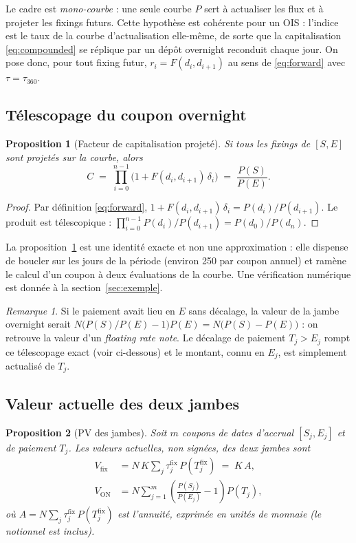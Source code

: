 \documentclass[11pt,a4paper]{article}
\newcommand{\DF}[1]{P(#1)}
\theoremstyle{plain}
\newtheorem{proposition}{Proposition}
\theoremstyle{definition}
\theoremstyle{remark}
\newtheorem*{remarque}{Remarque}
\begin{document}
Le cadre est \emph{mono-courbe} : une seule courbe $P$ sert à actualiser les flux et à projeter les
fixings futurs. Cette hypothèse est cohérente pour un OIS : l'indice est le taux de la courbe
d'actualisation elle-même, de sorte que la capitalisation \eqref{eq:compounded} se réplique par un
dépôt overnight reconduit chaque jour. On pose donc, pour tout fixing futur,
$r_i=F(d_i,d_{i+1})$ au sens de \eqref{eq:forward} avec $\tau=\tau_{360}$.

\subsection{Télescopage du coupon overnight}

\begin{proposition}[Facteur de capitalisation projeté]\label{prop:telescope}
Si tous les fixings de $[S,E]$ sont projetés sur la courbe, alors
\[
  C \;=\; \prod_{i=0}^{n-1}\bigl(1+F(d_i,d_{i+1})\,\delta_i\bigr) \;=\; \frac{\DF{S}}{\DF{E}}.
\]
\end{proposition}

\begin{proof}
Par définition \eqref{eq:forward}, $1+F(d_i,d_{i+1})\,\delta_i=\DF{d_i}/\DF{d_{i+1}}$. Le produit est
télescopique : $\prod_{i=0}^{n-1}\DF{d_i}/\DF{d_{i+1}}=\DF{d_0}/\DF{d_n}$.
\end{proof}

La proposition~\ref{prop:telescope} est une identité exacte et non une approximation : elle dispense
de boucler sur les jours de la période (environ 250 par coupon annuel) et ramène le calcul d'un
coupon à deux évaluations de la courbe. Une vérification numérique est donnée à la
section~\ref{sec:exemple}.

\begin{remarque}
Si le paiement avait lieu en $E$ sans décalage, la valeur de la jambe overnight serait
$N\bigl(\DF{S}/\DF{E}-1\bigr)\DF{E}=N\bigl(\DF{S}-\DF{E}\bigr)$ : on retrouve la valeur d'un
\emph{floating rate note}. Le décalage de paiement $T_j>E_j$ rompt ce télescopage exact (voir
ci-dessous) et le montant, connu en $E_j$, est simplement actualisé de $T_j$.
\end{remarque}

\subsection{Valeur actuelle des deux jambes}

\begin{proposition}[PV des jambes]\label{prop:legs}
Soit $m$ coupons de dates d'accrual $[S_j,E_j]$ et de paiement $T_j$. Les valeurs actuelles,
non signées, des deux jambes sont
\begin{align}
  V_{\mathrm{fix}} &= N\,K\sum_{j}\tau^{\mathrm{fix}}_j\,\DF{T^{\mathrm{fix}}_j} \;=\; K\,A,
  \label{eq:vfix}\\
  V_{\mathrm{ON}} &= N\sum_{j=1}^{m}\left(\frac{\DF{S_j}}{\DF{E_j}}-1\right)\DF{T_j},
  \label{eq:von}
\end{align}
où $A=N\sum_j\tau^{\mathrm{fix}}_j\,\DF{T^{\mathrm{fix}}_j}$ est l'\emph{annuité}, exprimée en
unités de monnaie (le notionnel est inclus).
\end{proposition}
\end{document}
